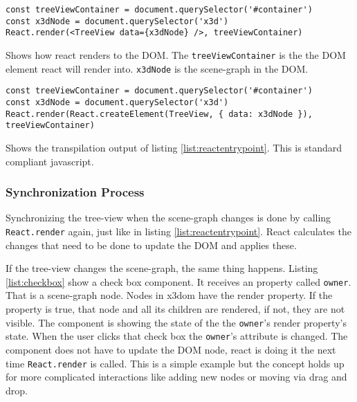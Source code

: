 \begin{listing}
  \begin{verbatim}
const treeViewContainer = document.querySelector('#container')
const x3dNode = document.querySelector('x3d')
React.render(<TreeView data={x3dNode} />, treeViewContainer)
  \end{verbatim}
  \caption{Shows how react renders to the DOM. The \texttt{treeViewContainer} is the the DOM element react will render into. \texttt{x3dNode} is the scene-graph in the DOM.}
  \label{list:reactentrypoint}
\end{listing}

\begin{listing}
  \begin{verbatim}
const treeViewContainer = document.querySelector('#container')
const x3dNode = document.querySelector('x3d')
React.render(React.createElement(TreeView, { data: x3dNode }), treeViewContainer)
  \end{verbatim}
  \caption{Shows the transpilation output of listing \ref{list:reactentrypoint}. This is standard compliant javascript.}
  \label{list:reacttranspiled}
\end{listing}

\subsubsection{Synchronization Process}
\label{synchronization-process}

Synchronizing the tree-view when the scene-graph changes is done by calling
\texttt{React.render} again, just like in listing \ref{list:reactentrypoint}. React
calculates the changes that need to be done to update the DOM and applies these.

If the tree-view changes the scene-graph, the same thing happens. Listing
\ref{list:checkbox} show a check box component. It receives an property called
\texttt{owner}. That is a scene-graph node. Nodes in x3dom have the render
property. If the property is true, that node and all its children are rendered,
if not, they are not visible. The component is showing the state of the the
\texttt{owner}'s render property's state. When the user clicks that check box the
\texttt{owner}'s attribute is changed. The component does not have to update the
DOM node, react is doing it the next time \texttt{React.render} is called. This
is a simple example but the concept holds up for more complicated interactions
like adding new nodes or moving via drag and drop.

